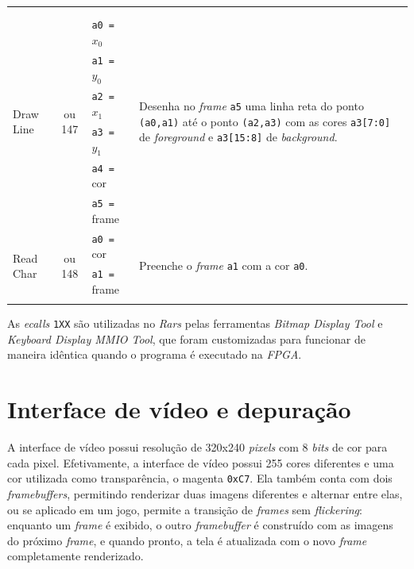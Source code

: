 \begin{longtable}{|l|c|p{3.5cm}|l |}
            & & & \\*
            & & & \\
        \hline
        \multirow{6}{*}{Draw Line}          & \multirow{6}{*}{\parbox{0.6cm}{ ou 147}}
              & \texttt{a0 =} $x_0$       & \multirow{6}{*}{\parbox{7cm}{Desenha no \textit{frame} \texttt{a5} uma linha reta do ponto \texttt{(a0,a1)} até o ponto \texttt{(a2,a3)}
                                                com as cores \texttt{a3[7:0]} de \textit{foreground} e \texttt{a3[15:8]} de \textit{background}.}}\\*
            & & \texttt{a1 =} $y_0$       & \\*
            & & \texttt{a2 =} $x_1$       & \\*
            & & \texttt{a3 =} $y_1$       & \\*
            & & \texttt{a4 =} cor         & \\*
            & & \texttt{a5 =} frame       & \\
        \hline
        \multirow{3}{*}{Read Char}          & \multirow{3}{*}{\parbox{0.6cm}{ ou 148}}
            & \texttt{a0 =} cor           & \multirow{3}{*}{\parbox{7cm}{Preenche o \textit{frame} \texttt{a1} com a cor \texttt{a0}.}}\\*
            & & \texttt{a1 =} frame       & \\*
            & & & \\
        \hline
    \end{longtable}

    { As \textit{ecalls} \texttt{1XX} são utilizadas no \textit{Rars} pelas
        ferramentas \textit{Bitmap Display Tool} e \textit{Keyboard Display MMIO
        Tool}, que foram customizadas para funcionar de maneira idêntica quando
        o programa é executado na \textit{FPGA}.
    }

    \section{Interface de vídeo e depuração}
    { A interface de vídeo possui resolução de 320x240 \textit{pixels} com 8
        \textit{bits} de cor para cada pixel. Efetivamente, a interface de vídeo
        possui 255 cores diferentes e uma cor utilizada como transparência, o
        magenta \texttt{0xC7}. Ela também conta com dois \textit{framebuffers},
        permitindo renderizar duas imagens diferentes e alternar entre elas, ou
        se aplicado em um jogo, permite a transição de \textit{frames} sem
        \textit{flickering}: enquanto um \textit{frame} é exibido, o outro
        \textit{framebuffer} é construído com as imagens do próximo \textit{frame},
        e quando pronto, a tela é atualizada com o novo \textit{frame}
        completamente renderizado.
    }


